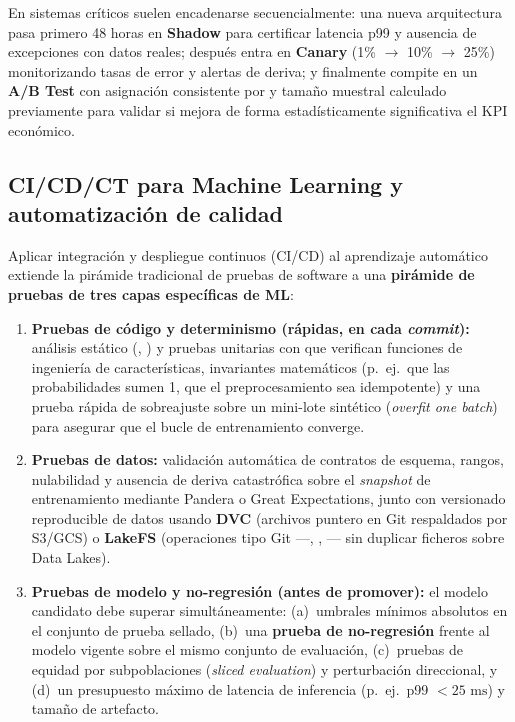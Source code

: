En sistemas críticos suelen encadenarse secuencialmente: una nueva arquitectura pasa primero 48 horas en \textbf{Shadow} para certificar latencia p99 y ausencia de excepciones con datos reales; después entra en \textbf{Canary} (1\% $\rightarrow$ 10\% $\rightarrow$ 25\%) monitorizando tasas de error y alertas de deriva; y finalmente compite en un \textbf{A/B Test} con asignación consistente por  y tamaño muestral calculado previamente para validar si mejora de forma estadísticamente significativa el KPI económico.

\subsection{CI/CD/CT para Machine Learning y automatización de calidad}

Aplicar integración y despliegue continuos (CI/CD) al aprendizaje automático extiende la pirámide tradicional de pruebas de software a una \textbf{pirámide de pruebas de tres capas específicas de ML}:

\begin{enumerate}
  \item \textbf{Pruebas de código y determinismo (rápidas, en cada \textit{commit}):} análisis estático (, ) y pruebas unitarias con  que verifican funciones de ingeniería de características, invariantes matemáticos (p.~ej.\ que las probabilidades sumen 1, que el preprocesamiento sea idempotente) y una prueba rápida de sobreajuste sobre un mini-lote sintético (\textit{overfit one batch}) para asegurar que el bucle de entrenamiento converge.
  \item \textbf{Pruebas de datos:} validación automática de contratos de esquema, rangos, nulabilidad y ausencia de deriva catastrófica sobre el \textit{snapshot} de entrenamiento mediante Pandera o Great Expectations, junto con versionado reproducible de datos usando \textbf{DVC} (archivos puntero  en Git respaldados por S3/GCS) o \textbf{LakeFS} (operaciones tipo Git ---, , --- sin duplicar ficheros sobre Data Lakes).
  \item \textbf{Pruebas de modelo y no-regresión (antes de promover):} el modelo candidato debe superar simultáneamente: (a)~umbrales mínimos absolutos en el conjunto de prueba sellado, (b)~una \textbf{prueba de no-regresión} frente al modelo  vigente sobre el mismo conjunto de evaluación, (c)~pruebas de equidad por subpoblaciones (\textit{sliced evaluation}) y perturbación direccional, y (d)~un presupuesto máximo de latencia de inferencia (p.~ej.\ p99 $< 25\text{ ms}$) y tamaño de artefacto.
\end{enumerate}

